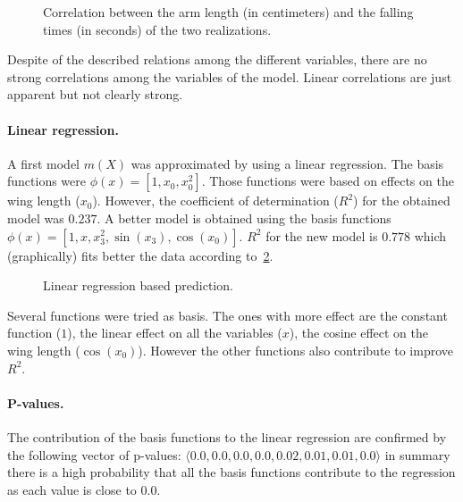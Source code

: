 \begin{figure}
  \centering
  
  \caption{Correlation between the arm length (in centimeters) and the falling
  times (in seconds) of the two realizations.}
  \label{fig_al_times}
\end{figure}

Despite of the described relations among the different variables, there are no
strong correlations among the variables of the model. Linear correlations are
just apparent but not clearly strong.

\paragraph{Linear regression.} A first model $m(X)$ was approximated by using a
linear regression. The basis functions were $\phi(x) = [1, x_0, x_0^2]$. Those
functions were based on effects on the wing length ($x_0$). However, the
coefficient of determination ($R^2$) for the obtained model was $0.237$. A
better model is obtained using the basis functions $\phi(x) = [1, x, x_3^2,
\sin(x_3), \cos(x_0)]$. $R^2$  for the new model is $0.778$ which (graphically)
fits better the data according to~\cref{fig_goodlr}.
\begin{figure}
  \centering
  
  \caption{Linear regression based prediction.}
  \label{fig_goodlr}
\end{figure}

\begin{comment}
  \begin{figure}
    \centering
    
    \caption{Comparison between the times measured in the two realizations.}
    \label{fig_badlr}
  \end{figure}
\end{comment}
Several functions were tried as basis. The ones with more effect are the
constant function ($1$), the linear effect on all the variables ($x$), the
cosine effect on the wing length ($\cos(x_0)$). However the other functions also
contribute to improve $R^2$.

\paragraph{P-values.} The contribution of the basis functions to the linear
regression are confirmed by the following vector of p-values: $\langle 0.0  ,
0.0  , 0.0  ,  0.0  ,  0.02,  0.01,  0.01,  0.0  \rangle$ in summary there is a
high probability that all the basis functions contribute to the regression as
each value is close to $0.0$.

